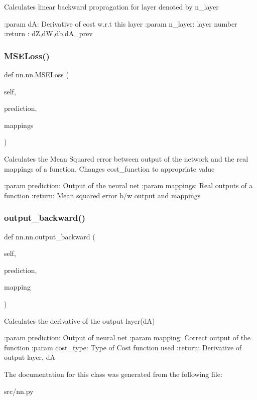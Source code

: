\begin{DoxyVerb}Calculates linear backward propragation for layer denoted by n_layer

:param dA: Derivative of cost w.r.t this layer
:param n_layer: layer number
:return : dZ,dW,db,dA_prev
\end{DoxyVerb}
 \mbox{\label{classnn_1_1nn_ae74a0f21e8722ea82a0f94135a81a348}} 
\subsubsection{\texorpdfstring{M\+S\+E\+Loss()}{MSELoss()}}
{\footnotesize\ttfamily def nn.\+nn.\+M\+S\+E\+Loss (\begin{DoxyParamCaption}\item[{}]{self,  }\item[{}]{prediction,  }\item[{}]{mappings }\end{DoxyParamCaption})}

\begin{DoxyVerb}Calculates the Mean Squared error between output of the network and the real mappings of a function.
Changes cost_function to appropriate value

:param prediction: Output of the neural net
:param mappings: Real outputs of a function
:return: Mean squared error b/w output and mappings
\end{DoxyVerb}
 \mbox{\label{classnn_1_1nn_afa7d1462872fae95fe71f27ed00bf7ae}} 
\subsubsection{\texorpdfstring{output\+\_\+backward()}{output\_backward()}}
{\footnotesize\ttfamily def nn.\+nn.\+output\+\_\+backward (\begin{DoxyParamCaption}\item[{}]{self,  }\item[{}]{prediction,  }\item[{}]{mapping }\end{DoxyParamCaption})}

\begin{DoxyVerb}Calculates the derivative of the output layer(dA)

:param prediction: Output of neural net
:param mapping: Correct output of the function
:param cost_type: Type of Cost function used
:return: Derivative of output layer, dA  
\end{DoxyVerb}
 

The documentation for this class was generated from the following file\+:\begin{DoxyCompactItemize}
\item 
src/nn.\+py\end{DoxyCompactItemize}
